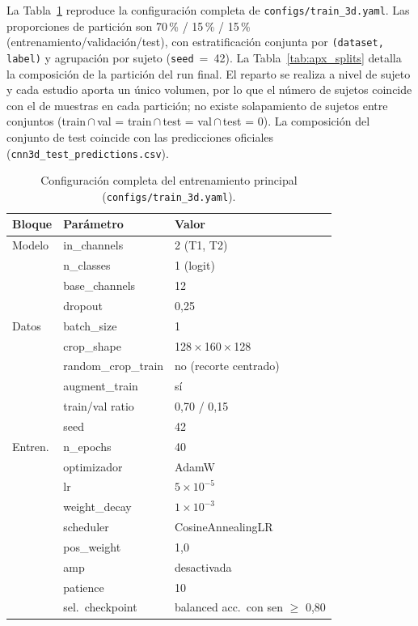 La Tabla~\ref{tab:apx_hiper} reproduce la configuración completa de
\texttt{configs/train\_3d.yaml}. Las proporciones de partición son
70\,\% / 15\,\% / 15\,\% (entrenamiento/validación/test), con estratificación
conjunta por \texttt{(dataset, label)} y agrupación por sujeto
(\texttt{seed}~=~42). La Tabla~\ref{tab:apx_splits} detalla la composición de la
partición del run final. El reparto se realiza a nivel de sujeto y cada estudio
aporta un único volumen, por lo que el número de sujetos coincide con el de
muestras en cada partición; no existe solapamiento de sujetos entre conjuntos
(train\,$\cap$\,val = train\,$\cap$\,test = val\,$\cap$\,test = 0). La composición
del conjunto de test coincide con las predicciones oficiales
(\texttt{cnn3d\_test\_predictions.csv}).

\begin{table}[ht]
  \centering
  \caption[Hiperparámetros completos del entrenamiento (pool)]{Configuración
  completa del entrenamiento principal (\texttt{configs/train\_3d.yaml}).}
  \label{tab:apx_hiper}
  \begin{tabular}{l l l}
    \hline
    \textbf{Bloque} & \textbf{Parámetro} & \textbf{Valor} \\
    \hline
    Modelo  & in\_channels        & 2 (T1, T2) \\
            & n\_classes          & 1 (logit) \\
            & base\_channels      & 12 \\
            & dropout             & 0,25 \\
    \hline
    Datos   & batch\_size         & 1 \\
            & crop\_shape         & 128\,$\times$\,160\,$\times$\,128 \\
            & random\_crop\_train & no (recorte centrado) \\
            & augment\_train      & sí \\
            & train/val ratio     & 0,70 / 0,15 \\
            & seed                & 42 \\
    \hline
    Entren. & n\_epochs           & 40 \\
            & optimizador         & AdamW \\
            & lr                  & $5\times10^{-5}$ \\
            & weight\_decay       & $1\times10^{-3}$ \\
            & scheduler           & CosineAnnealingLR \\
            & pos\_weight         & 1,0 \\
            & amp                 & desactivada \\
            & patience            & 10 \\
            & sel.\ checkpoint     & balanced acc.\ con sen $\geq$ 0,80 \\
    \hline
  \end{tabular}
\end{table}

